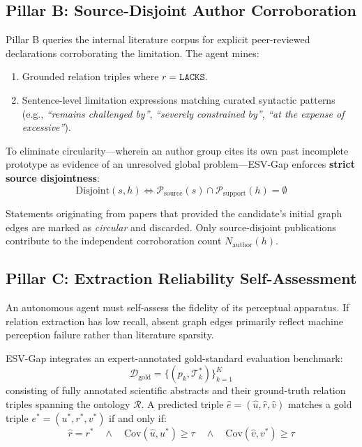 \documentclass[conference,10pt]{IEEEtran}
\newcommand{\method}{ESV-Gap}
\begin{document}
\subsection{Pillar B: Source-Disjoint Author Corroboration}
Pillar B queries the internal literature corpus for explicit peer-reviewed declarations corroborating the limitation. The agent mines:
\begin{enumerate}[label=\arabic*),leftmargin=1.8em]
  \item Grounded relation triples where $r = \texttt{LACKS}$.
  \item Sentence-level limitation expressions matching curated syntactic patterns (e.g., \emph{``remains challenged by''}, \emph{``severely constrained by''}, \emph{``at the expense of excessive''}).
\end{enumerate}

To eliminate circularity---wherein an author group cites its own past incomplete prototype as evidence of an unresolved global problem---\method{} enforces \textbf{strict source disjointness}:
\begin{equation}
\mathrm{Disjoint}(s, h) \iff \mathcal{P}_{\text{source}}(s) \cap \mathcal{P}_{\text{support}}(h) = \emptyset
\end{equation}

Statements originating from papers that provided the candidate's initial graph edges are marked as \emph{circular} and discarded. Only source-disjoint publications contribute to the independent corroboration count $N_{\text{author}}(h)$.

\subsection{Pillar C: Extraction Reliability Self-Assessment}
An autonomous agent must self-assess the fidelity of its perceptual apparatus. If relation extraction has low recall, absent graph edges primarily reflect machine perception failure rather than literature sparsity.

\method{} integrates an expert-annotated gold-standard evaluation benchmark:
\begin{equation}
\mathcal{D}_{\text{gold}} = \{(p_k, \mathcal{T}_k^*)\}_{k=1}^{K}
\end{equation}
consisting of fully annotated scientific abstracts and their ground-truth relation triples spanning the ontology $\mathcal{R}$. A predicted triple $\hat{e} = (\hat{u}, \hat{r}, \hat{v})$ matches a gold triple $e^* = (u^*, r^*, v^*)$ if and only if:
\begin{equation}
\hat{r} = r^* \quad \land \quad \mathrm{Cov}(\hat{u}, u^*) \ge \tau \quad \land \quad \mathrm{Cov}(\hat{v}, v^*) \ge \tau
\end{equation}
\end{document}
